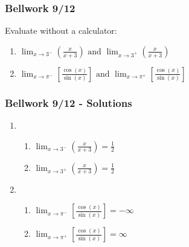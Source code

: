\documentclass[12pt]{beamer}
\begin{document}
\begin{frame}
	\frametitle{Bellwork 9/12}
	\vspace*{\fill}
	\vspace*{\fill}
	\initclock
	\large
	Evaluate without a calculator:\\
	\vspace*{\fill}
	\vspace*{\fill}
	\begin{center}
		\begin{minipage}{0.8\textwidth}
			\begin{enumerate}\itemsep4ex %
				\item $\displaystyle\lim_{x\to3^{-}}\left(\frac{x}{x+3}\right) \text{ and } \displaystyle\lim_{x\to3^{+}}\left(\frac{x}{x+3}\right)$
				\item $\displaystyle\lim_{x\to\pi^{-}}\left[\frac{\cos(x)}{\sin(x)}\right] \text{ and } \displaystyle\lim_{x\to\pi^{+}}\left[\frac{\cos(x)}{\sin(x)}\right]$
			\end{enumerate}
		\end{minipage}
	\end{center}
	\vspace*{\fill}
	\vspace*{\fill}
	\vspace*{\fill}
	\crono
\end{frame}
\begin{frame}
	\frametitle{Bellwork 9/12 - Solutions}
	\begin{center}
		\begin{minipage}{1\linewidth}
			\begin{enumerate}
				\item ~
				      \begin{enumerate}\itemsep2ex
					      \item $\displaystyle\lim_{x\to3^{-}}\left(\frac{x}{x+3}\right) = \frac{1}{2}$
					      \item $\displaystyle\lim_{x\to3^{+}}\left(\frac{x}{x+3}\right) = \frac{1}{2}$
				      \end{enumerate}
				\item ~
				      \begin{enumerate}\itemsep2ex
					      \item $\displaystyle\lim_{x\to\pi^{-}}\left[\frac{\cos(x)}{\sin(x)}\right] = -\infty$
					      \item $\displaystyle\lim_{x\to\pi^{+}}\left[\frac{\cos(x)}{\sin(x)}\right] = \infty$
				      \end{enumerate}
			\end{enumerate}
		\end{minipage}
	\end{center}
\end{frame}
\end{document}
